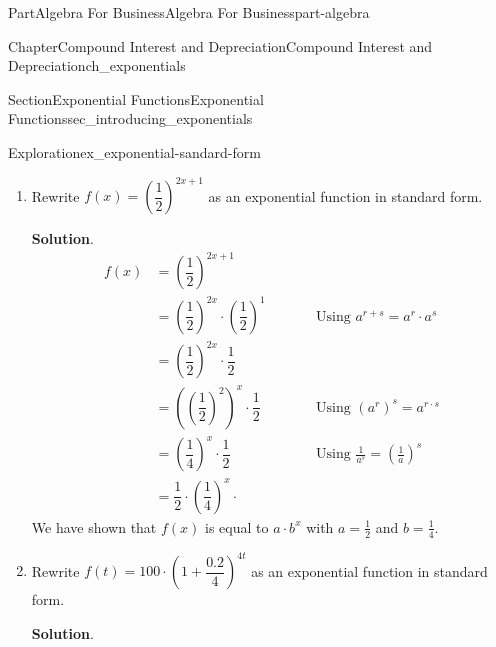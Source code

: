 \documentclass{tufte-book}
\newcommand{\blocktitlefont}{\relax}
\numberwithin{equation}{chapter}
\newcommand{\amp}{&}
\begin{document}
\begin{partptx}{Part}{Algebra For Business}{}{Algebra For Business}{}{}{part-algebra}
\begin{chapterptx}{Chapter}{Compound Interest and Depreciation}{}{Compound Interest and Depreciation}{}{}{ch_exponentials}
\begin{sectionptx}{Section}{Exponential Functions}{}{Exponential Functions}{}{}{sec_introducing_exponentials}
\begin{exploration}{Exploration}{}{ex_exponential-sandard-form}
\begin{enumerate}[font=\bfseries,label=(\alph*),ref=\alph*]
\begin{align*}
f(x) \amp = 2^{-2x} \amp \qquad\amp \\
\amp = \dfrac{1}{2^{2x}} \amp \qquad\amp \text{Using } a^{-r} = \frac{1}{a^r} \\
\amp = \dfrac{1}{ (2^2)^{x}} \amp \qquad\amp \text{Using } a^{r\cdot s} = (a^r)^s \\
\amp = \dfrac{1}{ (4)^{x}} \amp \qquad\amp   \\
\amp = \left(\dfrac{1}{ 4}\right)^{x} \amp \qquad\amp \text{Using } \frac{1}{a^{s}} =  \left(\frac{1}{a}\right)^s\\
\amp = {\color{red} 1\cdot} \left(0.25\right)^{x} \amp \qquad\amp 
\end{align*}
Note that in the second to last step, we only had a base and a power.  In the last step, we introduce a coefficient of \(1\), which does not change the value of the expression.%
\par
We have shown that \(f(x)\) is equal to \(a\cdot b^x\) with \(a=1\) and \(b=0.25\).%
\item{}Rewrite \(f(x) = \left(\dfrac{1}{2}\right)^{2x+1}\) as an exponential function in standard form.%
\par\smallskip%
\noindent\textbf{\blocktitlefont Solution}.\hypertarget{ex_exponential-sandard-form-3-2}{}\quad{}%
\begin{align*}
f(x) \amp = \left(\dfrac{1}{2}\right)^{2x+1} \amp \qquad\amp \\
\amp = \left(\dfrac{1}{2}\right)^{2x} \cdot \left(\dfrac{1}{2}\right)^{1} \amp \qquad\amp \text{Using } a^{r+s} =  a^r\cdot a^s\\
\amp = \left(\dfrac{1}{2}\right)^{2x} \cdot \dfrac{1}{2}  \amp \qquad\amp \\
\amp = \left(\left(\dfrac{1}{2}\right)^{2}\right)^x \cdot \dfrac{1}{2} \amp \qquad\amp \text{Using } {\left(a^{r}\right)}^s=  a^{r\cdot s}  \\
\amp = \left(\dfrac{1}{4}\right)^x \cdot \dfrac{1}{2} \amp \qquad\amp \text{Using } \frac{1}{a^{s}} =  \left(\frac{1}{a}\right)^s\\
\amp =  \dfrac{1}{2} \cdot \left(\dfrac{1}{4}\right)^x \cdot \amp 
\end{align*}
We have shown that \(f(x)\) is equal to \(a\cdot b^x\) with \(a=\frac{1}{2}\) and \(b=\frac{1}{4}\).%
\item{}Rewrite \(f(t) = 100 \cdot \left(1 + \dfrac{0.2}{4}\right)^{4t}\) as an exponential function in standard form.%
\par\smallskip%
\noindent\textbf{\blocktitlefont Solution}.\hypertarget{ex_exponential-sandard-form-4-2}{}\quad{}%

\end{enumerate}
\end{exploration}
\end{sectionptx}
\end{chapterptx}
\end{partptx}
\end{document}
